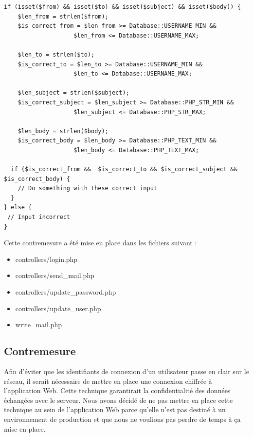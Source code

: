\documentclass[12pt]{article}
\begin{document}
\begin{lstlisting}[style=JAVA]
if (isset($from) && isset($to) && isset($subject) && isset($body)) {
    $len_from = strlen($from);
    $is_correct_from = $len_from >= Database::USERNAME_MIN && 
                    $len_from <= Database::USERNAME_MAX;
                            
    $len_to = strlen($to);
    $is_correct_to = $len_to >= Database::USERNAME_MIN && 
                    $len_to <= Database::USERNAME_MAX;

    $len_subject = strlen($subject);
    $is_correct_subject = $len_subject >= Database::PHP_STR_MIN && 
                    $len_subject <= Database::PHP_STR_MAX;
                            
    $len_body = strlen($body);
    $is_correct_body = $len_body >= Database::PHP_TEXT_MIN && 
                    $len_body <= Database::PHP_TEXT_MAX;

  if ($is_correct_from &&  $is_correct_to && $is_correct_subject && $is_correct_body) {
    // Do something with these correct input
  }
} else {
 // Input incorrect
}
\end{lstlisting}

Cette contremesure a été mise en place dans les fichiers suivant :

\begin{itemize}
\item controllers/login.php
\item controllers/send\_mail.php
\item controllers/update\_password.php
\item controllers/update\_user.php
\item write\_mail.php
\end{itemize}

\newpage
\subsection{Contremesure}\label{c8}

Afin d'éviter que les identifiants de connexion d'un utilisateur passe en clair sur le réseau, il serait nécessaire de mettre en place une connexion chiffrée à l'application Web. Cette technique garantirait la confidentialité des données échangées avec le serveur.
Nous avons décidé de ne pas mettre en place cette technique au sein de l'application Web parce qu'elle n'est pas destiné à un environnement de production et que nous ne voulions pas perdre de temps à ça mise en place.
\end{document}
